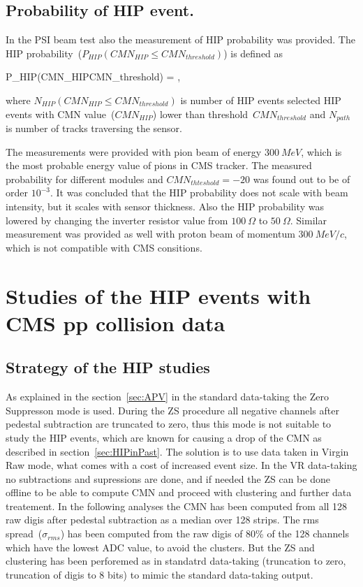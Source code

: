 
\subsection{Probability of HIP event.}

In the PSI beam test also the measurement of HIP probability was provided. The HIP probability~($P_{HIP}(CMN_{HIP}\leq CMN_{threshold})$) is defined as 

{
P_{HIP}(CMN_{HIP}\leq CMN_{threshold}) = ,
}

where $N_{HIP}(CMN_{HIP}\leq CMN_{threshold})$ is number of HIP events selected HIP events with CMN value~($CMN_{HIP}$) lower than threshold~$CMN_{threshold}$ and $N_{path}$ is number of tracks traversing the sensor.

The measurements were provided with pion beam of energy $300~MeV$, which is the most probable energy value of pions in CMS tracker. The measured probability for different modules and $CMN_{thteshold}=-20$ was found out to be of order $10^{-3}$. It was concluded that the HIP probability does not scale with beam intensity, but it scales with sensor thickness. Also the HIP probability was lowered by changing the inverter resistor value from $100~\Omega$ to  $50~\Omega$. Similar measurement was provided as well with proton beam of momentum $300~MeV/c$, which is not compatible with CMS consitions.


\section{Studies of the HIP events with CMS pp collision data}

\subsection{Strategy of the HIP studies}

As explained in the section~\ref{sec:APV} in the standard data-taking the Zero Suppresson mode is used. During the ZS procedure all negative channels after pedestal subtraction are truncated to zero, thus this mode is not suitable to study the HIP events, which are known for causing a drop of the CMN as described in section~\ref{sec:HIPinPast}. The solution is to use data taken in Virgin Raw mode, what comes with a cost of increased event size. In the VR data-taking no subtractions and supressions are done, and if needed the ZS can be done offline to be able to compute CMN and proceed with clustering and further data treatement. In the following analyses the CMN has been computed from all 128 raw digis after pedestal subtraction as a median over 128 strips. The rms spread~($\sigma_{rms}$) has been computed from the raw digis of 80\% of the 128 channels which have the lowest ADC value, to avoid the clusters. But the ZS and clustering has been perforemed as in standatrd data-taking (truncation to zero, truncation of digis to 8 bits) to mimic the standard data-taking output.

